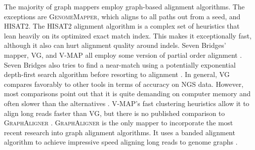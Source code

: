 The majority of graph mappers employ graph-based alignment algorithms. 
The exceptions are \textsc{GenomeMapper}, which aligns to all paths out from a seed, and \textsc{HISAT2}.
The \textsc{HISAT2} alignment algorithm is a complex set of heuristics that lean heavily on its optimized exact match index.  
This makes it exceptionally fast, although it also can hurt alignment quality around indels. 
Seven Bridges' mapper, \textsc{VG}, and \textsc{V-MAP} all employ some version of partial order alignment \cite{Rakocevic_2019, Garrison_2019, Vaddadi_2019}. 
Seven Bridges also tries to find a near-match using a potentially exponential depth-first search algorithm before resorting to alignment \cite{Rakocevic_2019}. 
In general, \textsc{VG} compares favorably to other tools in terms of accuracy on NGS data. 
However, most comparisons point out that it is quite demanding on computer memory and often slower than the alternatives \cite{Kim_2019, Vaddadi_2019}. 
\textsc{V-MAP}'s fast clustering heuristics allow it to align long reads faster than \textsc{VG}, but there is no published comparison to \textsc{GraphAligner} \cite{Vaddadi_2019}.
\textsc{GraphAligner} is the only mapper to incorporate the most recent research into graph alignment algorithms.
It uses a banded alignment algorithm to achieve impressive speed aligning long reads to genome graphs \cite{Rautiainen_2019b}.


